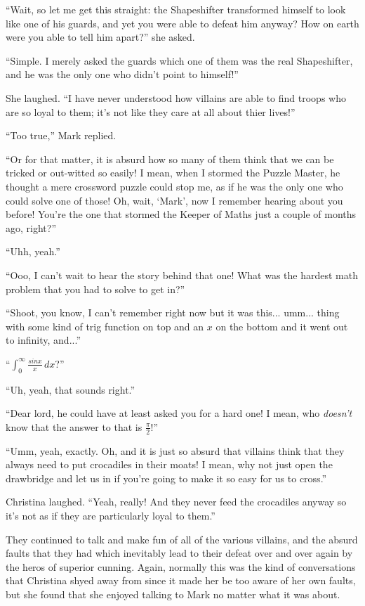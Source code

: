\documentclass[showtrims,b6paper,draft,10pt]{memoir}
\begin{document}
``Wait, so let me get this straight:  the Shapeshifter transformed himself to look like one of his guards, and yet you were able to defeat him anyway?  How on earth were you able to tell him apart?''  she asked.

``Simple.  I merely asked the guards which one of them was the real Shapeshifter, and he was the only one who didn't point to himself!''

She laughed.  ``I have never understood how villains are able to find troops who are so loyal to them;  it's not like they care at all about thier lives!''

``Too true,''  Mark replied.

``Or for that matter, it is absurd how so many of them think that we can be tricked or out-witted so easily!  I mean, when I stormed the Puzzle Master, he thought a mere crossword puzzle could stop me, as if he was the only one who could solve one of those!  Oh, wait, `Mark', now I remember hearing about you before!  You're the one that stormed the Keeper of Maths just a couple of months ago, right?''

``Uhh, yeah.''

``Ooo, I can't wait to hear the story behind that one!  What was the hardest math problem that you had to solve to get in?''

``Shoot, you know, I can't remember right now but it was this... umm... thing with some kind of trig function on top and an $x$ on the bottom and it went out to infinity, and...''

``$\int_0^{\infty}\!\frac{sin x}{x}\,dx$?''

``Uh, yeah, that sounds right.''

``Dear lord, he could have at least asked you for a hard one!  I mean, who \emph{doesn't} know that the answer to that is $\frac{\pi}{2}$!''

``Umm, yeah, exactly.  Oh, and it is just so absurd that villains think that they always need to put crocadiles in their moats!  I mean, why not just open the drawbridge and let us in if you're going to make it so easy for us to cross.''

Christina laughed.  ``Yeah, really!  And they never feed the crocadiles anyway so it's not as if they are particularly loyal to them.''

They continued to talk and make fun of all of the various villains, and the absurd faults that they had which inevitably lead to their defeat over and over again by the heros of superior cunning.  Again, normally this was the kind of conversations that Christina shyed away from since it made her be too aware of her own faults, but she found that she enjoyed talking to Mark no matter what it was about.
\end{document}
